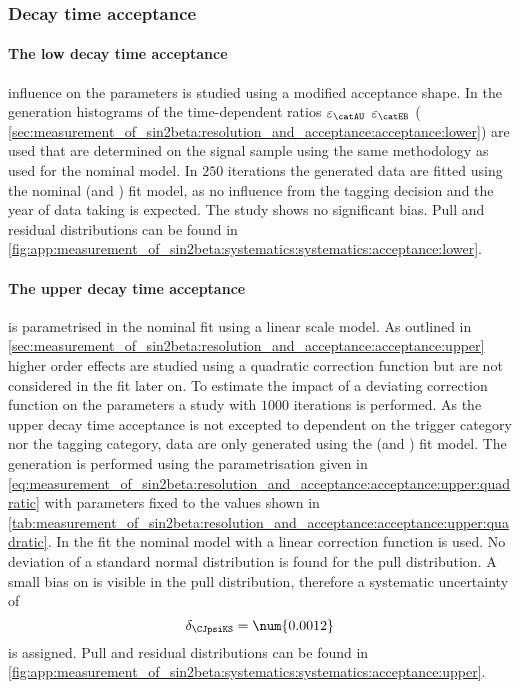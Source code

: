 \subsubsection{Decay time acceptance}
\label{sec:measurement_of_sin2beta:systematics:systematics:acceptance}

\paragraph{The low decay time acceptance} influence on the \CP parameters is
studied using a modified acceptance shape. In the generation histograms of the
time-dependent ratios $\varepsilon_{\catAU}$ $\varepsilon_{\catEB}$ (\cf
\cref{sec:measurement_of_sin2beta:resolution_and_acceptance:acceptance:lower})
are used that are determined on the signal \MC sample using the same methodology
as used for the nominal model. In $\num{250}$ iterations the generated data are
fitted using the nominal (\catOO and \catOS) fit model, as no influence from the
tagging decision and the year of data taking is expected. The \ToyMC study shows
no significant bias. Pull and residual distributions can be found
in
\cref{fig:app:measurement_of_sin2beta:systematics:systematics:acceptance:lower}.

\paragraph{The upper decay time acceptance} is parametrised in the nominal fit
using a linear scale model. As outlined in
\cref{sec:measurement_of_sin2beta:resolution_and_acceptance:acceptance:upper}
higher order effects are studied using a quadratic correction function but are
not considered in the fit later on. To estimate the impact of a deviating
correction function on the \CP parameters a \ToyMC study with $\num{1000}$
iterations is performed. As the upper decay time acceptance is not excepted to
dependent on the trigger category nor the tagging category, data are only
generated using the (\catAU and \catOS) fit model. The generation is performed
using the parametrisation given in \cref{eq:measurement_of_sin2beta:resolution_and_acceptance:acceptance:upper:quadratic} 
with parameters fixed to the values shown in
\cref{tab:measurement_of_sin2beta:resolution_and_acceptance:acceptance:upper:quadratic}. 
In the fit the nominal model with a linear correction function is used. No
deviation of a standard normal distribution is found for the \SJpsiKS pull
distribution. A small bias on \CJpsiKS is visible in the pull distribution,
therefore a systematic uncertainty of
%
\begin{equation}
  \delta_{\CJpsiKS} = \num{0.0012}
\end{equation}
%
is assigned. Pull and residual distributions can be found in
\cref{fig:app:measurement_of_sin2beta:systematics:systematics:acceptance:upper}.


